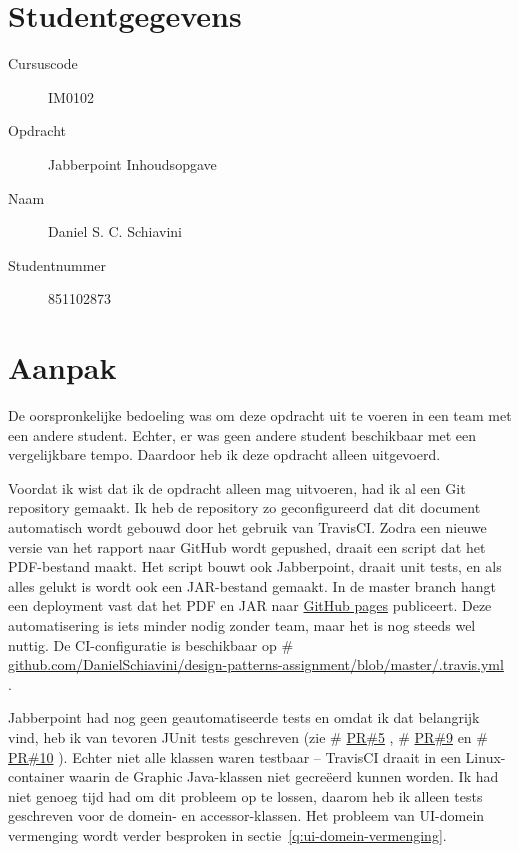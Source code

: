 \documentclass[a4paper]{article}
\makeatletter
\newcommand*{\repo}{\begingroup\@makeother\#\@repo}
\newcommand*{\@repo}[2]{%
  \href{https://github.com/DanielSchiavini/design-patterns-assignment/#1}{#2}%
  \endgroup}
\newcommand{\PR}[1]{\repo{pull/#1}{PR\##1}}
\newcommand{\repolink}[1]{\repo{#1}{github.com\-/Daniel\-Schiavini\-/de\-sign-\-pat\-terns-\-as\-sign\-ment\-/#1}}
\makeatother
\begin{document}
\pagestyle{fancy}

\section*{Studentgegevens}
    \begin{description}
        \item [Cursuscode] IM0102
        \item [Opdracht] Jabberpoint Inhoudsopgave
        \item [Naam] Daniel S. C. Schiavini
        \item [Studentnummer] 851102873
    \end{description}

\section*{Aanpak}
    \label{sec:aanpak}
    De oorspronkelijke bedoeling was om deze opdracht uit te voeren in een team met een andere student.
    Echter, er was geen andere student beschikbaar met een vergelijkbare tempo.
    Daardoor heb ik deze opdracht alleen uitgevoerd.

    Voordat ik wist dat ik de opdracht alleen mag uitvoeren, had ik al een Git repository gemaakt.
    Ik heb de repository zo geconfigureerd dat dit document automatisch wordt gebouwd door het gebruik van TravisCI.
    Zodra een nieuwe versie van het rapport naar GitHub wordt gepushed, draait een script dat het PDF-bestand maakt.
    Het script bouwt ook Jabberpoint, draait unit tests, en als alles gelukt is wordt ook een JAR-bestand gemaakt.
    In de master branch hangt een deployment vast dat het PDF en JAR naar \href{https://github.com/DanielSchiavini/design-patterns-assignment/tree/gh-pages}{GitHub pages} publiceert.
    Deze automatisering is iets minder nodig zonder team, maar het is nog steeds wel nuttig.
    De CI-configuratie is beschikbaar op \repolink{blob/master/.travis.yml}.

    Jabberpoint had nog geen geautomatiseerde tests en omdat ik dat belangrijk vind, heb ik van tevoren JUnit tests geschreven (zie \PR{5}, \PR{9} en \PR{10}).
    Echter niet alle klassen waren testbaar -- TravisCI draait in een Linux-container waarin de Graphic Java-klassen niet gecreëerd kunnen worden.
    Ik had niet genoeg tijd had om dit probleem op te lossen, daarom heb ik alleen tests geschreven voor de domein- en accessor-klassen.
    Het probleem van UI-domein vermenging wordt verder besproken in sectie~\ref{q:ui-domein-vermenging}.
\end{document}
